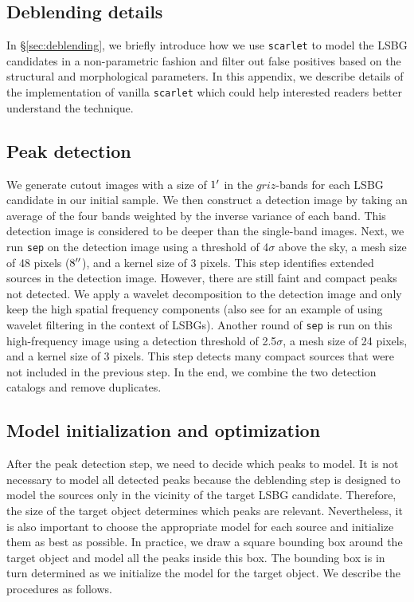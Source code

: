 \documentclass[twocolumn,astrosymb,twocolappendix]{aastex631}
\newcommand{\code}[1]{\texttt{#1}}
\begin{document}
\begin{CJK*}{UTF8}{gbsn}

\section{Deblending details}\label{ap:deblending}
In \S\ref{sec:deblending}, we briefly introduce how we use \code{scarlet} to model the LSBG candidates in a non-parametric fashion and filter out false positives based on the structural and morphological parameters. In this appendix, we describe details of the implementation of vanilla \code{scarlet} which could help interested readers better understand the technique.

\subsection{Peak detection}\label{sec:peak}
We generate cutout images with a size of $1\mbox{$^\prime$}$ in the $griz$-bands for each LSBG candidate in our initial sample. We then construct a detection image by taking an average of the four bands weighted by the inverse variance of each band. This detection image is considered to be deeper than the single-band images. 
Next, we run \code{sep} on the detection image using a threshold of 4$\sigma$ above the sky, a mesh size of 48 pixels ($8\mbox{$^{\prime\prime}$}$), and a kernel size of 3 pixels. This step identifies extended sources in the detection image. However, there are still faint and compact peaks not detected. We apply a wavelet decomposition to the detection image \citep{Starck2015} and only keep the high spatial frequency components (also see \citealt{Zaritsky2019} for an example of using wavelet filtering in the context of LSBGs). Another round of \code{sep} is run on this high-frequency image using a detection threshold of 2.5$\sigma$, a mesh size of 24 pixels, and a kernel size of 3 pixels. This step detects many compact sources that were not included in the previous step. In the end, we combine the two detection catalogs and remove duplicates. 

\subsection{Model initialization and optimization}
After the peak detection step, we need to decide which peaks to model. It is not necessary to model all detected peaks because the deblending step is designed to model the sources only in the vicinity of the target LSBG candidate. Therefore, the size of the target object determines which peaks are relevant. Nevertheless, it is also important to choose the appropriate model for each source and initialize them as best as possible. In practice, we draw a square bounding box around the target object and model all the peaks inside this box. The bounding box is in turn determined as we initialize the model for the target object. We describe the procedures as follows. 


\end{CJK*}
\end{document}
